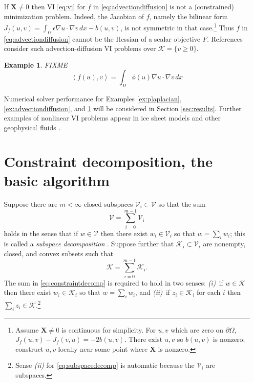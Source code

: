 \documentclass[letterpaper,final,12pt,reqno]{amsart}
\theoremstyle{cstyle}
\theoremstyle{cstyle*}
\theoremstyle{dstyle}
\newtheorem{example}[theorem]{Example}
\numberwithin{equation}{section}
\numberwithin{figure}{section}
\numberwithin{table}{section}
\numberwithin{theorem}{section}
\newcommand{\eps}{\epsilon}
\newcommand{\grad}{\nabla}
\newcommand{\bX}{\mathbf{X}}
\newcommand{\cK}{\mathcal{K}}
\newcommand{\cV}{\mathcal{V}}
\newcommand{\ip}[2]{\left<#1,#2\right>}
\begin{document}
If $\bX \ne 0$ then VI \eqref{eq:vi} for $f$ in \eqref{eq:advectiondiffusion} is not a (constrained) minimization problem.  Indeed, the Jacobian of $f$, namely the bilinear form $J_f(u,v) = \int_\Omega \eps \grad u \cdot \grad v\,dx - b(u,v)$, is not symmetric in that case.\footnote{Assume $\bX \ne 0$ is continuous for simplicity.  For $u,v$ which are zero on $\partial \Omega$, $J_f(u,v) - J_f(v,u) = -2 b(u,v)$.  There exist $u,v$ so $b(u,v)$ is nonzero; construct $u,v$ locally near some point where $\bX$ is nonzero.}  Thus $f$ in \eqref{eq:advectiondiffusion} cannot be the Hessian of a scalar objective $F$.  References \cite{Bueler2021conservation,ChangNakshatrala2017} consider such advection-diffusion VI problems over $\cK = \{v\ge 0\}$.

\begin{example}  \label{ex:porous}  FIXME
\begin{equation}
\ip{f(u)}{v} = \int_\Omega \phi(u) \grad u \cdot \grad v\,dx \label{eq:porous}
\end{equation}
\end{example}

Numerical solver performance for Examples \ref{ex:plaplacian}, \ref{ex:advectiondiffusion}, and \ref{ex:porous} will be considered in Section \ref{sec:results}.  Further examples of nonlinear VI problems appear in ice sheet models \cite{Calvoetal2002,JouvetBueler2012} and other geophysical fluids \cite{Bueler2021conservation}.


\section{Constraint decomposition, the basic algorithm} \label{sec:cd}

Suppose there are $m<\infty$ closed subspaces $\cV_i \subset \cV$ so that the sum
\begin{equation}
\cV = \sum_{i=0}^{m-1} \cV_i \label{eq:subspacedecomp}
\end{equation}
holds in the sense that if $w \in \cV$ then there exist $w_i \in \cV_i$ so that $w = \sum_i w_i$; this is called a \emph{subspace decomposition} \cite{Xu1992}.  Suppose further that $\cK_i \subset \cV_i$ are nonempty, closed, and convex subsets such that
\begin{equation}
\cK = \sum_{i=0}^{m-1} \cK_i. \label{eq:constraintdecomp}
\end{equation}
The sum in \eqref{eq:constraintdecomp} is required to hold in two senses: \emph{(i)}~if $w \in \cK$ then there exist $w_i \in \cK_i$ so that $w = \sum_i w_i$, and \emph{(ii)}~if $z_i \in \cK_i$ for each $i$ then $\sum_i z_i \in \cK$.\footnote{Sense \emph{(ii)} for \eqref{eq:subspacedecomp} is automatic because the $\cV_i$ are subspaces.}
\end{document}
